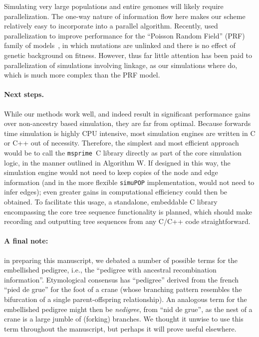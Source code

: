 \documentclass{article}
\newcommand{\simupop}{\texttt{simuPOP}}
\newcommand{\msprime}{\texttt{msprime}}
\begin{document}
Simulating very large populations and entire genomes will likely require parallelization.
The one-way nature of information flow here makes our scheme relatively easy to incorporate
into a parallel algorithm.
Recently, \citet{lawrie2017accelerating} used parallelization
to improve performance for the ``Poisson Random Field'' (PRF) family of models~\citep{Sawyer1992-jw},
in which mutations are unlinked and there is no effect of genetic background on fitness.
However, thus far little attention has been paid to parallelization of simulations involving linkage, as our simulations
where do, which is much more
complex than the PRF model.

\paragraph{Next steps.}
While our methods work well, and indeed result in significant performance
gains over non-ancestry based simulation, they are far from optimal. Because
forwards time simulation is highly CPU intensive, most simulation engines
are written in C or C++ out of necessity. Therefore, the simplest and most
efficient approach would be to call the \msprime\ C library directly as part of
the core simulation logic, in the manner outlined in Algorithm W. If designed
in this way, the simulation engine would not need to keep copies of the node
and edge information (and in the more flexible \simupop{} implementation, would
not need to infer edges);
even greater gains in computational efficiency could then be obtained. To
facilitate this usage, a standalone, embeddable C library encompassing the core
tree sequence functionality is planned, which should make recording and
outputting tree sequences from any C/C++ code straightforward.

\paragraph{A final note:}
in preparing this manuscript,
we debated a number of possible terms for the embellished pedigree,
i.e., the ``pedigree with ancestral recombination information''.
Etymological consensus \citep{liberman2014little} has
``pedigree'' derived from the french ``pied de grue'' for the foot of a crane
(whose branching pattern resembles the bifurcation of a single parent-offspring relationship).
An analogous term for the embellished pedigree might then be \emph{nedigree},
from ``nid de grue'',
as the nest of a crane is a large jumble of (forking) branches.
We thought it unwise to use this term throughout the manuscript,
but perhaps it will prove useful elsewhere.
\end{document}
